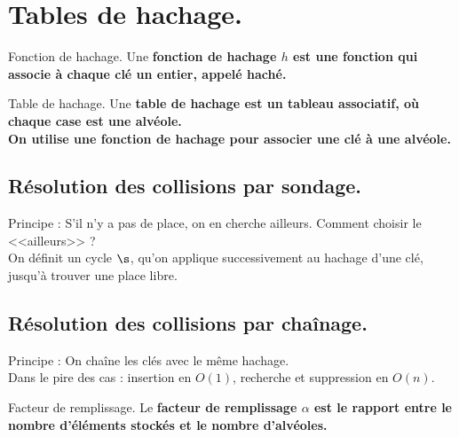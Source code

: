 \documentclass[french, 11pt]{article}
\begin{document}
\section{Tables de hachage.}

\begin{defi}{Fonction de hachage.}{}
    Une \bf{fonction de hachage} $h$ est une fonction qui associe à chaque clé un entier, appelé \bf{haché}.
\end{defi}

\begin{defi}{Table de hachage.}{}
    Une \bf{table de hachage} est un tableau associatif, où chaque case est une alvéole.\\
    On utilise une fonction de hachage pour associer une clé à une alvéole.
\end{defi}

\subsection{Résolution des collisions par sondage.}

\begin{defi}{}{}
    Principe : S'il n'y a pas de place, on en cherche ailleurs. Comment choisir le <<ailleurs>> ?\\
    On définit un cycle $\s$, qu'on applique successivement au hachage d'une clé, jusqu'à trouver une place libre.
\end{defi}

\subsection{Résolution des collisions par chaînage.}

\begin{defi}{}{}
    Principe : On chaîne les clés avec le même hachage.\\
    Dans le pire des cas : insertion en $O(1)$, recherche et suppression en $O(n)$.
\end{defi}

\begin{defi}{Facteur de remplissage.}{}
    Le \bf{facteur de remplissage} $\alpha$ est le rapport entre le nombre d'éléments stockés et le nombre d'alvéoles.
\end{defi}
\end{document}

